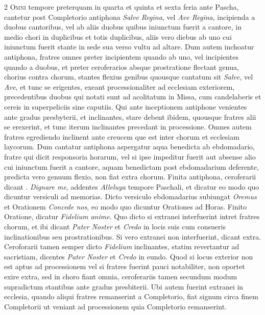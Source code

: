\begin{multicols*}{2}
{\color{Red} }
\lettrine[lines=2]{\zallmancaps \color{Red} O}{mni} tempore preterquam in quarta et quinta et sexta feria ante Pascha, cantetur post Completorio antiphona \textit{Salve Regina}, vel \textit{Ave Regina}, incipienda a duobus cantoribus, vel ab aliis duobus quibus iniunctum fuerit a cantore, in medio chori in duplicibus et totis duplicibus, aliis vero diebus ab uno cui iniunctum fuerit stante in sede sua verso vultu ad altare.
Dum autem inchoatur antiphona, fratres omnes preter incipientem quando ab uno, vel incipientes quando a duobus, et preter ceroferarios absque prostratione flectant genua, chorius contra chorum, stantes flexius genibus quousque cantatum sit \textit{Salve}, vel \textit{Ave}, et tunc se erigentes, exeant processionaliter ad ecclesiam exteriorem, precedentibus duobus qui notati sunt ad acolitatum in Missa, cum candelaberis et cereis in superpeliciis sine caputiis. Qui ante inceptionem antiphone venientes ante gradus presbyterii, et inclinantes, stare debent ibidem, quousque fratres alii se erexerint, et tunc iterum inclinantes precedant in processione. Omnes autem fratres egrediendo inclinent ante creucem que est inter chorum et ecclesiam laycorum.
Dum cantatur antiphona aspergatur aqua benedicta ab ebdomadario, fratre qui dicit responsoria horarum, vel si ipse impeditur fuerit aut absense alio cui iniunctum fuerit a cantore, aquam benedictam post ebdomadarium deferente, predicta vero genuum flexio, non fiat extra chorum. Finita antiphona, ceroferarii dicant \Vbar . \textit{Dignare me}, addentes \textit{Alleluya} tempore Paschali, et dicatur eo modo quo dicuntur versiculi ad memorias. Dicto versiculo ebdomadarius subiungat \textit{Oremus} et Orationem \textit{Concede nos}, eo modo quo dicuntur Orationes ad Horas. Finito Oratione, dicatur \textit{Fidelium anime}. Quo dicto si extranei interfuerint intret fratres chorum, et ibi dicant \textit{Pater Noster} et \textit{Credo} in locis suis cum consueris inclinationibus seu prostrationibus.
Si vero extranei non interfuerint, dicant extra. Ceroforarii tamen semper dicto \textit{Fidelium} inclinantes, statim revertantur ad sacristiam, dicentes \textit{Pater Noster} et \textit{Credo} in eundo. Quod si locus exterior non est aptus ad processionem vel si fratres fuerint pauci notabiliter, non oportet exire extra, sed in choro fiant omnia, ceroferariis tamen secundum modum supradictum stantibus ante gradus presbiterii.
Ubi autem fuerint extranei in ecclesia, quando aliqui fratres remanserint a Completorio, fiat signum circa finem Completorii ut veniant ad processionem quia Completorio remanserint.


\end{multicols*}

